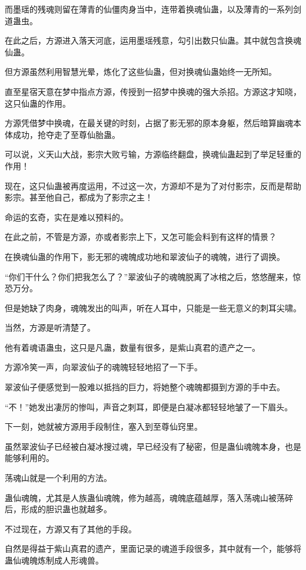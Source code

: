 \begin{this_body}
而墨瑶的残魂则留在薄青的仙僵肉身当中，连带着换魂仙蛊，以及薄青的一系列剑道蛊虫。

在此之后，方源进入落天河底，运用墨瑶残意，勾引出数只仙蛊。其中就包含换魂仙蛊。

但方源虽然利用智慧光晕，炼化了这些仙蛊，但对换魂仙蛊始终一无所知。

直至星宿天意在梦中指点方源，传授到一招梦中换魂的强大杀招。方源这才知晓，这只仙蛊的作用。

方源凭借梦中换魂，在最关键的时刻，占据了影无邪的原本身躯，然后暗算幽魂本体成功，抢夺走了至尊仙胎蛊。

可以说，义天山大战，影宗大败亏输，方源临终翻盘，换魂仙蛊起到了举足轻重的作用！

现在，这只仙蛊被再度运用，不过这一次，方源却不是为了对付影宗，反而是帮助影宗。甚至他自己，都成为了影宗之主！

命运的玄奇，实在是难以预料的。

在此之前，不管是方源，亦或者影宗上下，又怎可能会料到有这样的情景？

在换魂仙蛊的作用下，影无邪的魂魄成功地和翠波仙子的魂魄，进行了调换。

“你们干什么？你们把我怎么了？”翠波仙子的魂魄脱离了冰棺之后，悠悠醒来，惊恐万分。

但是她缺了肉身，魂魄发出的叫声，听在人耳中，只能是一些无意义的刺耳尖啸。

当然，方源是听清楚了。

他有着魂语蛊虫，这只是凡蛊，数量有很多，是紫山真君的遗产之一。

方源冷笑一声，向翠波仙子的魂魄轻轻地招了一下手。

翠波仙子便感觉到一股难以抵挡的巨力，将她整个魂魄都摄到方源的手中去。

“不！”她发出凄厉的惨叫，声音之刺耳，即便是白凝冰都轻轻地皱了一下眉头。

下一刻，她就被方源用手段制住，塞入到至尊仙窍里。

虽然翠波仙子已经被白凝冰搜过魂，早已经没有了秘密，但是蛊仙魂魄本身，也是能够利用的。

荡魂山就是一个利用的方法。

蛊仙魂魄，尤其是人族蛊仙魂魄，修为越高，魂魄底蕴越厚，落入荡魂山被荡碎后，形成的胆识蛊也就越多。

不过现在，方源又有了其他的手段。

自然是得益于紫山真君的遗产，里面记录的魂道手段很多，其中就有一个，能够将蛊仙魂魄炼制成人形魂兽。


\end{this_body}
